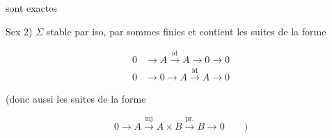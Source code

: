 sont exactes

Sex 2) $\Sigma$ stable par iso, par sommes finies et contient les suites de la forme

\[
 \begin{aligned}0&\longrightarrow A\xrightarrow{\mathrm{id}} A\longrightarrow0\longrightarrow0\\
 0&\longrightarrow0\longrightarrow A\xrightarrow{\mathrm{id}} A\longrightarrow0\end{aligned}
\]

(donc aussi les suites de la forme

\[
 0\longrightarrow A\xrightarrow{\mathrm{inj}}A\times B\xrightarrow{\mathrm{pr.}}B\longrightarrow0\qquad)
\]

